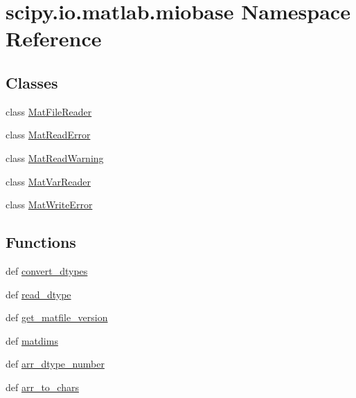 \hypertarget{namespacescipy_1_1io_1_1matlab_1_1miobase}{}\section{scipy.\+io.\+matlab.\+miobase Namespace Reference}
\label{namespacescipy_1_1io_1_1matlab_1_1miobase}
\subsection*{Classes}
\begin{DoxyCompactItemize}
\item 
class \hyperlink{classscipy_1_1io_1_1matlab_1_1miobase_1_1MatFileReader}{Mat\+File\+Reader}
\item 
class \hyperlink{classscipy_1_1io_1_1matlab_1_1miobase_1_1MatReadError}{Mat\+Read\+Error}
\item 
class \hyperlink{classscipy_1_1io_1_1matlab_1_1miobase_1_1MatReadWarning}{Mat\+Read\+Warning}
\item 
class \hyperlink{classscipy_1_1io_1_1matlab_1_1miobase_1_1MatVarReader}{Mat\+Var\+Reader}
\item 
class \hyperlink{classscipy_1_1io_1_1matlab_1_1miobase_1_1MatWriteError}{Mat\+Write\+Error}
\end{DoxyCompactItemize}
\subsection*{Functions}
\begin{DoxyCompactItemize}
\item 
def \hyperlink{namespacescipy_1_1io_1_1matlab_1_1miobase_a5f28dbe80498bb3dd7aaca54dbf9d3c5}{convert\+\_\+dtypes}
\item 
def \hyperlink{namespacescipy_1_1io_1_1matlab_1_1miobase_ad7767c5ac1d3c37d24a033f53f604e32}{read\+\_\+dtype}
\item 
def \hyperlink{namespacescipy_1_1io_1_1matlab_1_1miobase_acaa5454430b7e843115f6f7a0fa54cc6}{get\+\_\+matfile\+\_\+version}
\item 
def \hyperlink{namespacescipy_1_1io_1_1matlab_1_1miobase_afa77a3e2cd5aefc8a6b9a93d4035e095}{matdims}
\item 
def \hyperlink{namespacescipy_1_1io_1_1matlab_1_1miobase_aa693199480b4c6760fbda1ec4df04dab}{arr\+\_\+dtype\+\_\+number}
\item 
def \hyperlink{namespacescipy_1_1io_1_1matlab_1_1miobase_a26f6c7dc4a0788e7d5d7a90612501d70}{arr\+\_\+to\+\_\+chars}
\end{DoxyCompactItemize}
